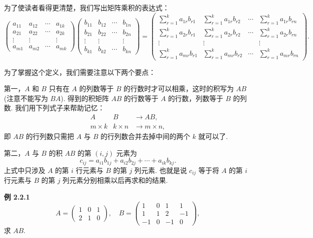 \documentclass[UTF8,12pt,a4paper,fontset=fandol]{ctexart}
\begin{document}
为了使读者看得更清楚，我们写出矩阵乘积的表达式：
\[
\left(\begin{array}{cccc}
a_{11} & a_{12} & \cdots & a_{1k}\\
a_{21} & a_{22} & \cdots & a_{2k}\\
\vdots & \vdots & & \vdots\\
a_{m1} & a_{m2} & \cdots & a_{mk}
\end{array}\right)
\left(\begin{array}{cccc}
b_{11} & b_{12} & \cdots & b_{1n}\\
b_{21} & b_{22} & \cdots & b_{2n}\\
\vdots & \vdots & & \vdots\\
b_{k1} & b_{k2} & \cdots & b_{kn}
\end{array}\right)
=
\left(\begin{array}{cccc}
\sum\limits_{r=1}^{k}a_{1r}b_{r1} & \sum\limits_{r=1}^{k}a_{1r}b_{r2} & \cdots & \sum\limits_{r=1}^{k}a_{1r}b_{rn}\\
\sum\limits_{r=1}^{k}a_{2r}b_{r1} & \sum\limits_{r=1}^{k}a_{2r}b_{r2} & \cdots & \sum\limits_{r=1}^{k}a_{2r}b_{rn}\\
\vdots & \vdots & & \vdots\\
\sum\limits_{r=1}^{k}a_{mr}b_{r1} & \sum\limits_{r=1}^{k}a_{mr}b_{r2} & \cdots & \sum\limits_{r=1}^{k}a_{mr}b_{rn}
\end{array}\right).
\]

为了掌握这个定义，我们需要注意以下两个要点：

第一，$A$ 和 $B$ 只有在 $A$ 的列数等于 $B$ 的行数时才可以相乘，这时的积写为 $AB$ (注意不能写为 $BA$). 得到的积矩阵 $AB$ 的行数等于 $A$ 的行数，列数等于 $B$ 的列数. 我们用下列式子来帮助记忆：
\[
\begin{array}{ccc}
A & B & \longrightarrow AB,\\
m\times k & k\times n & \longrightarrow m\times n,
\end{array}
\]
即 $AB$ 的行列数只需把 $A$ 与 $B$ 的行列数合并去掉中间的两个 $k$ 就可以了.

第二，$A$ 与 $B$ 的积 $AB$ 的第 $(i,j)$ 元素为
\[
c_{ij}=a_{i1}b_{1j}+a_{i2}b_{2j}+\cdots+a_{ik}b_{kj}.
\]
上式中只涉及 $A$ 的第 $i$ 行元素与 $B$ 的第 $j$ 列元素. 也就是说 $c_{ij}$ 等于将 $A$ 的第 $i$ 行元素与 $B$ 的第 $j$ 列元素分别相乘以后再求和的结果.

\noindent\textbf{例 2.2.1}\quad
\[
A=\left(\begin{array}{ccc}
1 & 0 & 1\\
2 & 1 & 0
\end{array}\right),\quad
B=\left(\begin{array}{cccc}
1 & 0 & 1 & 1\\
1 & 1 & 2 & -1\\
-1 & 0 & -1 & 0
\end{array}\right),
\]
求 $AB$.
\end{document}
